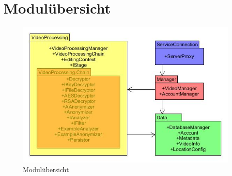 \section{Modulübersicht} \label{dienst:modul}

\begin{figure}[ht]
	\centering
\includegraphics[width=1\textwidth]{./resources/Diagramme/Webservice/modules_overview.jpg}
\caption{Modulübersicht}
	\label{fig:modules_overview}
\end{figure}




